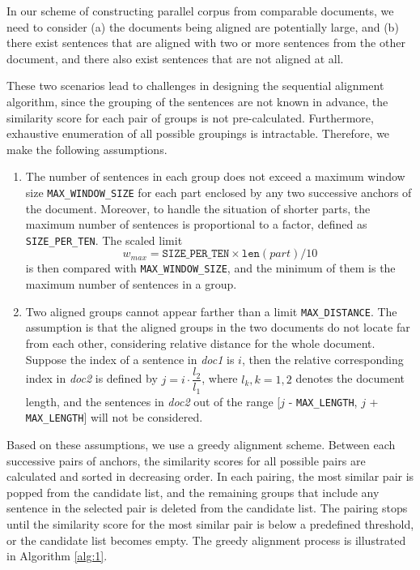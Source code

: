 \documentclass[runningheads]{llncs}
\begin{document}
\begin{spacing}{1.1}
In our scheme of constructing parallel corpus from comparable documents, we need to consider (a) the documents being aligned are potentially large, and (b) there exist sentences that are aligned with two or more sentences from the other document, and there also exist sentences that are not aligned at all.

These two scenarios lead to challenges in designing the sequential alignment algorithm, since the grouping of the sentences are not known in advance, the similarity score for each pair of groups is not pre-calculated. Furthermore, exhaustive enumeration of all possible groupings is intractable. Therefore, we make the following assumptions.
\begin{enumerate}
	\item The number of sentences in each group does not exceed a maximum window size \texttt{MAX\_WINDOW\_SIZE} for each part enclosed by any two successive anchors of the document. Moreover, to handle the situation of shorter parts, the maximum number of sentences is proportional to a factor, defined as \texttt{SIZE\_PER\_TEN}. The scaled limit
	$$w_{max} = \texttt{SIZE\_PER\_TEN} \times \texttt{len}(part) / 10$$
	is then compared with \texttt{MAX\_WINDOW\_SIZE}, and the minimum of them is the maximum number of sentences in a group.
	\item Two aligned groups cannot appear farther than a limit \texttt{MAX\_DISTANCE}. The assumption is that the aligned groups in the two documents do not locate far from each other, considering relative distance for the whole document. Suppose the index of a sentence in \emph{doc1} is $i$, then the relative corresponding index in \emph{doc2} is defined by $j = i\cdot \dfrac{l_2}{l_1}$, where $l_k, k = 1, 2$ denotes the document length, and the sentences in \emph{doc2} out of the range [$j$ - \texttt{MAX\_LENGTH}, $j$ + \texttt{MAX\_LENGTH}] will not be considered.
\end{enumerate}

Based on these assumptions, we use a greedy alignment scheme. Between each successive pairs of anchors, the similarity scores for all possible pairs are calculated and sorted in decreasing order. In each pairing, the most similar pair is popped from the candidate list, and the remaining groups that include any sentence in the selected pair is deleted from the candidate list. The pairing stops until the similarity score for the most similar pair is below a predefined threshold, or the candidate list becomes empty. The greedy alignment process is illustrated in Algorithm \ref{alg:1}.


\end{spacing}
\end{document}
